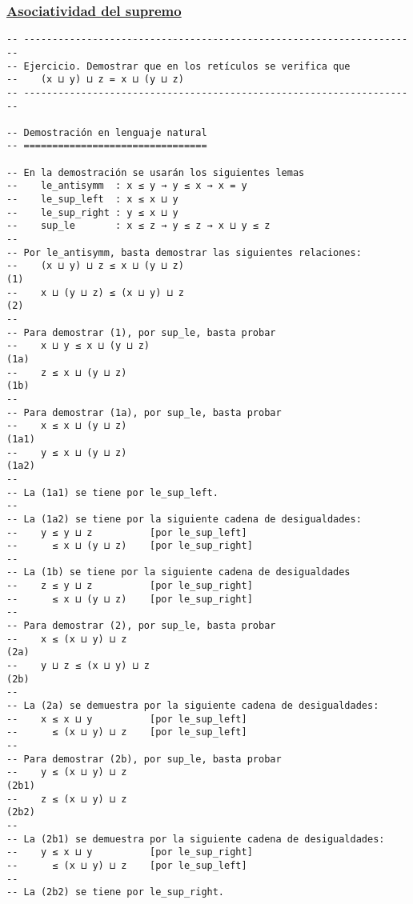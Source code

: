 \subsubsection{\href{./src/Basicos/Asociatividad\_del\_supremo.lean}{Asociatividad del supremo}}
\label{sec:org8324ba5}
\begin{verbatim}
-- ---------------------------------------------------------------------
-- Ejercicio. Demostrar que en los retículos se verifica que
--    (x ⊔ y) ⊔ z = x ⊔ (y ⊔ z)
-- ---------------------------------------------------------------------

-- Demostración en lenguaje natural
-- ================================

-- En la demostración se usarán los siguientes lemas
--    le_antisymm  : x ≤ y → y ≤ x → x = y
--    le_sup_left  : x ≤ x ⊔ y
--    le_sup_right : y ≤ x ⊔ y
--    sup_le       : x ≤ z → y ≤ z → x ⊔ y ≤ z
--
-- Por le_antisymm, basta demostrar las siguientes relaciones:
--    (x ⊔ y) ⊔ z ≤ x ⊔ (y ⊔ z)                                      (1)
--    x ⊔ (y ⊔ z) ≤ (x ⊔ y) ⊔ z                                      (2)
--
-- Para demostrar (1), por sup_le, basta probar
--    x ⊔ y ≤ x ⊔ (y ⊔ z)                                           (1a)
--    z ≤ x ⊔ (y ⊔ z)                                               (1b)
--
-- Para demostrar (1a), por sup_le, basta probar
--    x ≤ x ⊔ (y ⊔ z)                                              (1a1)
--    y ≤ x ⊔ (y ⊔ z)                                              (1a2)
--
-- La (1a1) se tiene por le_sup_left.
--
-- La (1a2) se tiene por la siguiente cadena de desigualdades:
--    y ≤ y ⊔ z          [por le_sup_left]
--      ≤ x ⊔ (y ⊔ z)    [por le_sup_right]
--
-- La (1b) se tiene por la siguiente cadena de desigualdades
--    z ≤ y ⊔ z          [por le_sup_right]
--      ≤ x ⊔ (y ⊔ z)    [por le_sup_right]
--
-- Para demostrar (2), por sup_le, basta probar
--    x ≤ (x ⊔ y) ⊔ z                                               (2a)
--    y ⊔ z ≤ (x ⊔ y) ⊔ z                                           (2b)
--
-- La (2a) se demuestra por la siguiente cadena de desigualdades:
--    x ≤ x ⊔ y          [por le_sup_left]
--      ≤ (x ⊔ y) ⊔ z    [por le_sup_left]
--
-- Para demostrar (2b), por sup_le, basta probar
--    y ≤ (x ⊔ y) ⊔ z                                              (2b1)
--    z ≤ (x ⊔ y) ⊔ z                                              (2b2)
--
-- La (2b1) se demuestra por la siguiente cadena de desigualdades:
--    y ≤ x ⊔ y          [por le_sup_right]
--      ≤ (x ⊔ y) ⊔ z    [por le_sup_left]
--
-- La (2b2) se tiene por le_sup_right.



\end{verbatim}

